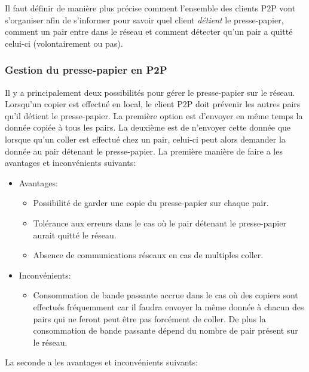 Il faut définir de manière plus précise comment l'ensemble des clients P2P
vont s'organiser afin de s'informer pour savoir quel client \emph{détient} le
presse-papier, comment un pair entre dans le réseau et comment détecter
qu'un pair a quitté celui-ci (volontairement ou pas).

\subsubsection{Gestion du presse-papier en P2P}
Il y a principalement deux possibilités pour gérer le presse-papier
sur le réseau. Lorsqu'un copier est effectué en local, le client P2P
doit prévenir les autres pairs qu'il détient le presse-papier.
La première option est d'envoyer en même temps la donnée copiée à tous les
pairs. La deuxième est de n'envoyer cette donnée que lorsque qu'un coller
est effectué chez un pair, celui-ci peut alors demander la donnée au pair
détenant le presse-papier.
La première manière de faire a les avantages et inconvénients suivants:
\begin{itemize}
\item Avantages:
  \begin{itemize}
  \item Possibilité de garder une copie du presse-papier sur chaque pair.
  \item Tolérance aux erreurs dans le cas où le pair détenant le presse-papier
    aurait quitté le réseau.
  \item Absence de communications réseaux en cas de multiples coller.
  \end{itemize}
\item Inconvénients:
  \begin{itemize}
  \item Consommation de bande passante accrue dans le cas où des copiers
    sont effectués fréquemment car il faudra envoyer la même donnée à chacun
    des pairs qui ne feront peut être pas forcément de coller. De plus la
    consommation de bande passante dépend du nombre de pair présent sur le
    réseau.
  \end{itemize}
\end{itemize}
La seconde a les avantages et inconvénients suivants:
